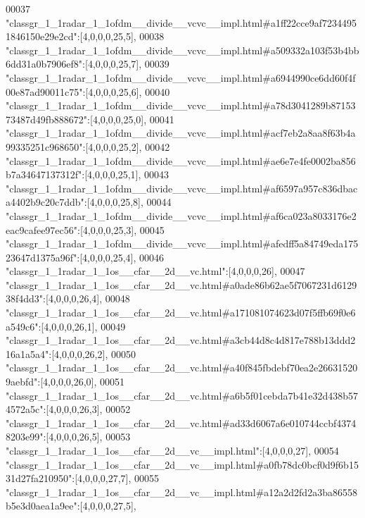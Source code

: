 \begin{DoxyCode}
00037 \textcolor{stringliteral}{"classgr\_1\_1radar\_1\_1ofdm\_\_divide\_\_vcvc\_\_impl.html#a1ff22cce9af72344951846150e29e2cd"}:[4,0,0,0,25,5],
00038 \textcolor{stringliteral}{"classgr\_1\_1radar\_1\_1ofdm\_\_divide\_\_vcvc\_\_impl.html#a509332a103f53b4bb6dd31a0b7906ef8"}:[4,0,0,0,25,7],
00039 \textcolor{stringliteral}{"classgr\_1\_1radar\_1\_1ofdm\_\_divide\_\_vcvc\_\_impl.html#a6944990ce6dd60f4f00e87ad90011c75"}:[4,0,0,0,25,6],
00040 \textcolor{stringliteral}{"classgr\_1\_1radar\_1\_1ofdm\_\_divide\_\_vcvc\_\_impl.html#a78d3041289b8715373487d49fb888672"}:[4,0,0,0,25,0],
00041 \textcolor{stringliteral}{"classgr\_1\_1radar\_1\_1ofdm\_\_divide\_\_vcvc\_\_impl.html#acf7eb2a8aa8f63b4a99335251c968650"}:[4,0,0,0,25,2],
00042 \textcolor{stringliteral}{"classgr\_1\_1radar\_1\_1ofdm\_\_divide\_\_vcvc\_\_impl.html#ae6e7e4fe0002ba856b7a34647137312f"}:[4,0,0,0,25,1],
00043 \textcolor{stringliteral}{"classgr\_1\_1radar\_1\_1ofdm\_\_divide\_\_vcvc\_\_impl.html#af6597a957c836dbaca4402b9c20c7ddb"}:[4,0,0,0,25,8],
00044 \textcolor{stringliteral}{"classgr\_1\_1radar\_1\_1ofdm\_\_divide\_\_vcvc\_\_impl.html#af6ca023a8033176e2eac9cafee97ec56"}:[4,0,0,0,25,3],
00045 \textcolor{stringliteral}{"classgr\_1\_1radar\_1\_1ofdm\_\_divide\_\_vcvc\_\_impl.html#afedff5a84749eda17523647d1375a96f"}:[4,0,0,0,25,4],
00046 \textcolor{stringliteral}{"classgr\_1\_1radar\_1\_1os\_\_cfar\_\_2d\_\_vc.html"}:[4,0,0,0,26],
00047 \textcolor{stringliteral}{"classgr\_1\_1radar\_1\_1os\_\_cfar\_\_2d\_\_vc.html#a0ade86b62ae5f7067231d612938f4dd3"}:[4,0,0,0,26,4],
00048 \textcolor{stringliteral}{"classgr\_1\_1radar\_1\_1os\_\_cfar\_\_2d\_\_vc.html#a171081074623d07f5ffb69f0e6a549c6"}:[4,0,0,0,26,1],
00049 \textcolor{stringliteral}{"classgr\_1\_1radar\_1\_1os\_\_cfar\_\_2d\_\_vc.html#a3cb44d8c4d817e788b13ddd216a1a5a4"}:[4,0,0,0,26,2],
00050 \textcolor{stringliteral}{"classgr\_1\_1radar\_1\_1os\_\_cfar\_\_2d\_\_vc.html#a40f845fbdebf70ea2e266315209aebfd"}:[4,0,0,0,26,0],
00051 \textcolor{stringliteral}{"classgr\_1\_1radar\_1\_1os\_\_cfar\_\_2d\_\_vc.html#a6b5f01cebda7b41e32d438b574572a5c"}:[4,0,0,0,26,3],
00052 \textcolor{stringliteral}{"classgr\_1\_1radar\_1\_1os\_\_cfar\_\_2d\_\_vc.html#ad33d6067a6e010744ccbf43748203e99"}:[4,0,0,0,26,5],
00053 \textcolor{stringliteral}{"classgr\_1\_1radar\_1\_1os\_\_cfar\_\_2d\_\_vc\_\_impl.html"}:[4,0,0,0,27],
00054 \textcolor{stringliteral}{"classgr\_1\_1radar\_1\_1os\_\_cfar\_\_2d\_\_vc\_\_impl.html#a0fb78dc0bcf0d9f6b1531d27fa210950"}:[4,0,0,0,27,7],
00055 \textcolor{stringliteral}{"classgr\_1\_1radar\_1\_1os\_\_cfar\_\_2d\_\_vc\_\_impl.html#a12a2d2fd2a3ba86558b5e3d0aea1a9ee"}:[4,0,0,0,27,5],

\end{DoxyCode}
